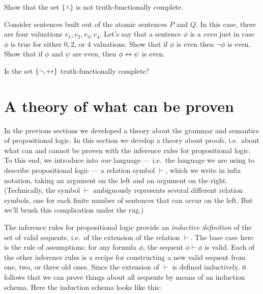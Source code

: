 \begin{exercise} 
Show that the set $\{ \wedge \}$ is not truth-functionally
complete. \end{exercise}
\begin{exercise} Consider sentences built out of the atomic sentences $P$ and
    $Q$.  In this case, there are four valuations $v_1,v_2,v_3,v_4$.
    Let's say that a sentence $\phi$ is a {\it even} just in case
    $\phi$ is true for either $0,2$, or $4$ valuations.  Show that if
    $\phi$ is even then $\neg \phi$ is even.  Show that if $\phi$ and
    $\psi$ are even, then $\phi\leftrightarrow\psi$ is even. \end{exercise}
  \begin{exercise} Is the set $\{ \neg ,\leftrightarrow \}$ truth-functionally
    complete? \end{exercise}









\section{A theory of what can be proven}

In the previous sections we developed a theory about the grammar and
semantics of propositional logic.  In this section we develop a theory
about proofs, i.e.\ about what can and cannot be proven with the
inference rules for propositional logic.  To this end, we introduce
into {\it our} language --- i.e.\ the language we are using to
describe propositional logic --- a relation symbol $\vdash$, which we
write in infix notation, taking an argument on the left and an
argument on the right.  (Technically, the symbol $\vdash$ ambiguously
represents several different relation symbols, one for each finite
number of sentences that can occur on the left.  But we'll brush this
complication under the rug.)

The inference rules for propositional logic provide an \emph{inductive
  definition} of the set of valid sequents, i.e.\ of the extension of
the relation $\vdash$.   The base case
here is the rule of assumptions: for any formula $\phi$, the sequent
$\phi\vdash\phi$ is valid.  Each of the other inference rules is a
recipe for constructing a new valid sequent from one, two, or three
old ones.  Since the extension of $\vdash$ is defined inductively, it
follows that we can prove things about all sequents by means of an
induction schema.  Here the induction schema looks like this:

